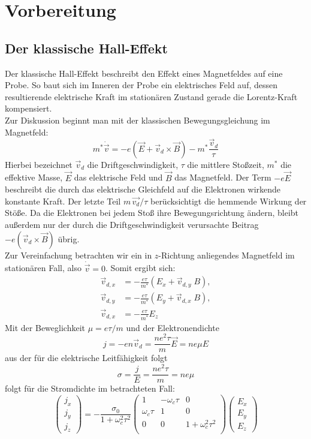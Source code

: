 \chapter{Vorbereitung}

\section{Der klassische Hall-Effekt}

Der klassische Hall-Effekt beschreibt den Effekt eines Magnetfeldes auf eine
Probe. So baut sich im Inneren der Probe ein elektrisches Feld auf, dessen
resultierende elektrische Kraft im stationären Zustand gerade die Lorentz-Kraft
kompensiert.\\
Zur Diskussion beginnt man mit der klassischen Bewegungsgleichung im Magnetfeld:
\[
    m^* \dot{\vec{v}} = - e \left( \vec{E} + \vec{v}_d \times \vec{B} \right)
                      - m^* \frac{\vec{v}_d}{\tau}
\]
Hierbei bezeichnet $\vec{v}_d$ die Driftgeschwindigkeit, $\tau$ die mittlere
Stoßzeit, $m^*$ die effektive Masse, $\vec{E}$ das elektrische Feld und $\vec{B}$
das Magnetfeld. Der Term $-e \vec{E}$ beschreibt die durch das elektrische 
Gleichfeld auf die Elektronen wirkende konstante Kraft. Der letzte Teil 
$m \, \vec{v_d} / \tau$ berücksichtigt die hemmende Wirkung der Stöße. 
Da die Elektronen bei jedem Stoß ihre Bewegungsrichtung ändern, bleibt außerdem
nur der durch die Driftgeschwindigkeit verursachte Beitrag 
$-e \left( \vec{v}_d \times \vec{B} \right)$ übrig.\\
Zur Vereinfachung betrachten wir ein in $z$-Richtung anliegendes Magnetfeld
im stationären Fall, also $\dot{\vec{v}} = 0$. Somit ergibt sich:
\begin{align*}
    \vec{v}_{d,x} &= - \frac{e \tau}{m^*} \left( E_x + \vec{v}_{d,y} \; B \right),\\
    \vec{v}_{d,y} &= - \frac{e \tau}{m^*} \left( E_y + \vec{v}_{d,x} \; B \right),\\
    \vec{v}_{d,x} &= - \frac{e \tau}{m^*} E_z
\end{align*}
Mit der Beweglichkeit $\mu = e \tau / m$ und der Elektronendichte
\[
    j = -e n \vec{v}_d = \frac{n e^2 \tau}{m} \vec{E} = n e \mu E
\]
aus der für die elektrische Leitfähigkeit folgt
\[
    \sigma = \frac{j}{E} = \frac{n e^2 \tau}{m} = n e \mu
\]
folgt für die Stromdichte im betrachteten Fall:
\[
    \begin{pmatrix}
        j_x\\ j_y \\ j_z
    \end{pmatrix} 
    = - \frac{\sigma_0}{1 + \omega_c^2 \tau^2}
      \begin{pmatrix}
          1             & -\omega_c \tau    & 0 \\
          \omega_c \tau & 1                 & 0 \\
          0             & 0                 & 1+\omega_c^2 \tau^2 \\
      \end{pmatrix}
      \begin{pmatrix}
          E_x \\ E_y \\ E_z
      \end{pmatrix}
\]
